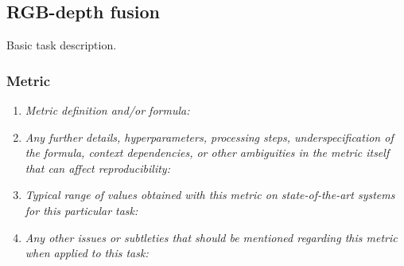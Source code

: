 \documentclass[a4paper,11pt]{article}
\begin{document}
    \subsection{RGB-depth fusion} \label{rgb_depth_fusion}
    Basic task description.
    \subsubsection{Metric}
        \begin{enumerate}[label=\alph*.]
            \item \textit{Metric definition and/or formula:}
            \bigskip
            \item \textit{Any further details, hyperparameters, processing steps, underspecification of the formula, context dependencies, or other ambiguities in the metric itself that can affect reproducibility:}
            \bigskip
            \item \textit{Typical range of values obtained with this metric on state-of-the-art systems for this particular task:}
            \bigskip
            \item \textit{Any other issues or subtleties that should be mentioned regarding this metric when applied to this task:}
            \bigskip
        \end{enumerate}
\end{document}
